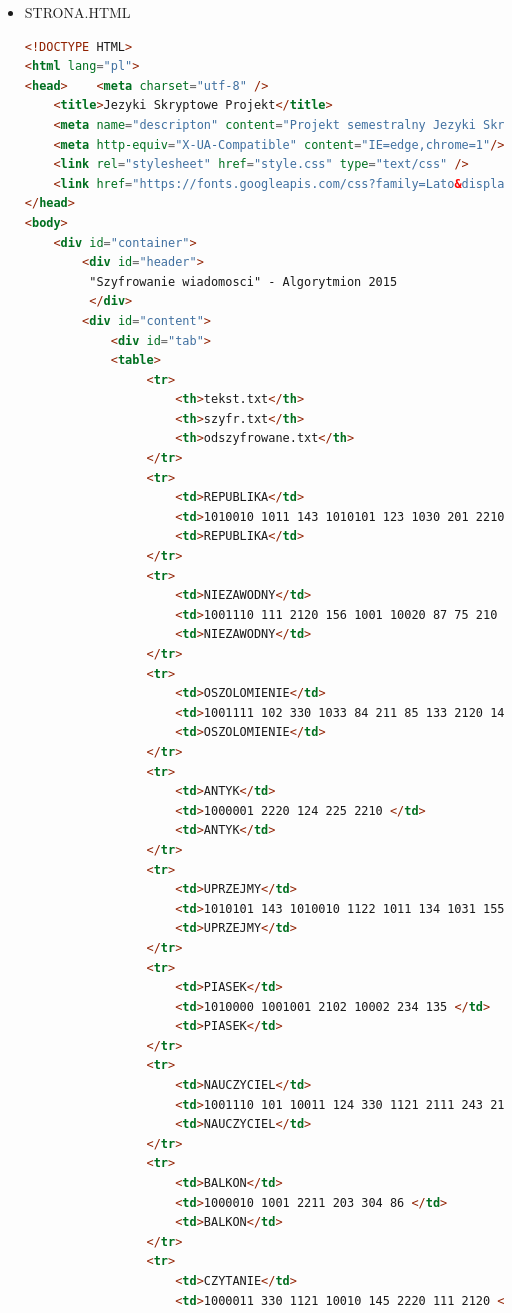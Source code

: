 \documentclass[12pt,a4paper]{article}
\begin{document}
\begin{itemize}
	\item STRONA.HTML
	\begin{lstlisting}[language=Html]
<!DOCTYPE HTML>
<html lang="pl">
<head>    <meta charset="utf-8" />
    <title>Jezyki Skryptowe Projekt</title>
    <meta name="descripton" content="Projekt semestralny Jezyki Skryptowe Konrad Lubera"/>
    <meta http-equiv="X-UA-Compatible" content="IE=edge,chrome=1"/> 
    <link rel="stylesheet" href="style.css" type="text/css" /> 
    <link href="https://fonts.googleapis.com/css?family=Lato&display=swap" rel="stylesheet"> 
</head> 
<body> 
    <div id="container"> 
        <div id="header"> 
         "Szyfrowanie wiadomosci" - Algorytmion 2015 
         </div> 
        <div id="content"> 
            <div id="tab">
            <table>
                 <tr>
                     <th>tekst.txt</th>
                     <th>szyfr.txt</th>
                     <th>odszyfrowane.txt</th>
                 </tr>
                 <tr>
                     <td>REPUBLIKA</td>
                     <td>1010010 1011 143 1010101 123 1030 201 2210 230 </td>
                     <td>REPUBLIKA</td> 
                 </tr>
                 <tr>
                     <td>NIEZAWODNY</td>
                     <td>1001110 111 2120 156 1001 10020 87 75 210 131 </td>
                     <td>NIEZAWODNY</td> 
                 </tr>
                 <tr>
                     <td>OSZOLOMIENIE</td>
                     <td>1001111 102 330 1033 84 211 85 133 2120 141 111 2120 </td>
                     <td>OSZOLOMIENIE</td> 
                 </tr>
                 <tr>
                     <td>ANTYK</td>
                     <td>1000001 2220 124 225 2210 </td>
                     <td>ANTYK</td> 
                 </tr>
                 <tr>
                     <td>UPRZEJMY</td>
                     <td>1010101 143 1010010 1122 1011 134 1031 155 </td>
                     <td>UPRZEJMY</td> 
                 </tr>
                 <tr>
                     <td>PIASEK</td>
                     <td>1010000 1001001 2102 10002 234 135 </td>
                     <td>PIASEK</td> 
                 </tr>
                 <tr>
                     <td>NAUCZYCIEL</td>
                     <td>1001110 101 10011 124 330 1121 2111 243 2120 136 </td>
                     <td>NAUCZYCIEL</td> 
                 </tr>
                 <tr>
                     <td>BALKON</td>
                     <td>1000010 1001 2211 203 304 86 </td>
                     <td>BALKON</td> 
                 </tr>
                 <tr>
                     <td>CZYTANIE</td>
                     <td>1000011 330 1121 10010 145 2220 111 2120 </td>

\end{lstlisting}
\end{itemize}
\end{document}
